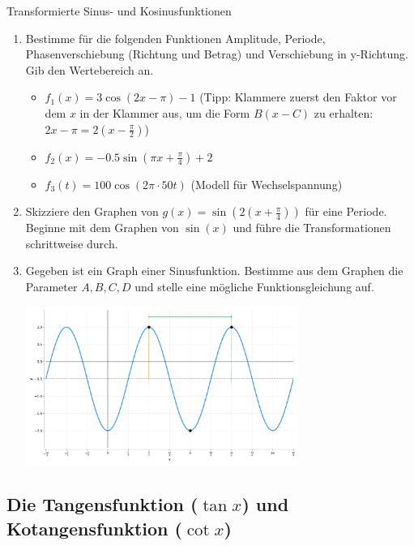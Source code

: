 \begin{aufgabenumgebung}{Transformierte Sinus- und Kosinusfunktionen}
\begin{enumerate}
    \item Bestimme für die folgenden Funktionen Amplitude, Periode, Phasenverschiebung (Richtung und Betrag) und Verschiebung in y-Richtung. Gib den Wertebereich an.
        \begin{itemize}
            \item $f_1(x) = 3 \cos(2x - \pi) - 1$ (Tipp: Klammere zuerst den Faktor vor dem $x$ in der Klammer aus, um die Form $B(x-C)$ zu erhalten: $2x-\pi = 2(x-\frac{\pi}{2})$)
            \item $f_2(x) = -0.5 \sin(\pi x + \frac{\pi}{4}) + 2$
            \item $f_3(t) = 100 \cos(2\pi \cdot 50 t)$ (Modell für Wechselspannung)
        \end{itemize}
    \item Skizziere den Graphen von $g(x) = \sin(2(x+\frac{\pi}{4}))$ für eine Periode. Beginne mit dem Graphen von $\sin(x)$ und führe die Transformationen schrittweise durch.
    \item Gegeben ist ein Graph einer Sinusfunktion. Bestimme aus dem Graphen die Parameter $A, B, C, D$ und stelle eine mögliche Funktionsgleichung auf.
        \begin{center}
            \includegraphics[width=0.7\textwidth]{grafiken/Trig_Graph_Ablesen.png}
            \label{fig:graph_ablesen}
        \end{center}
\end{enumerate}
\end{aufgabenumgebung}

\subsection{Die Tangensfunktion ($\tan x$) und Kotangensfunktion ($\cot x$)}
\label{subsec:tangens_kotangens}

